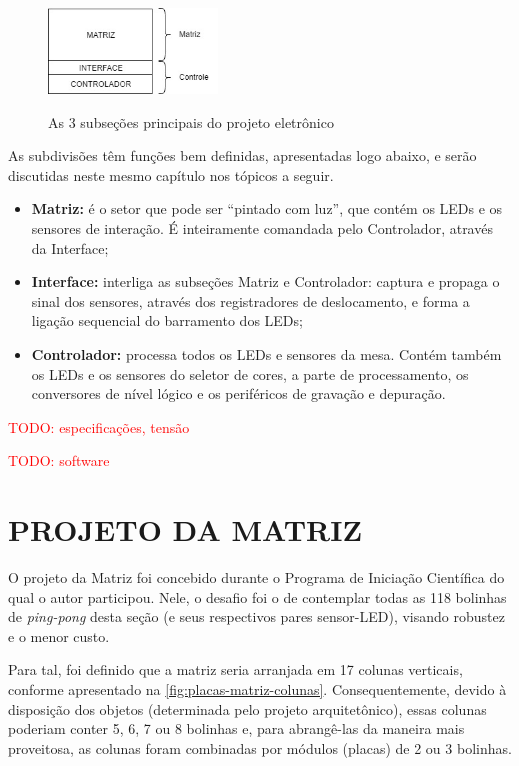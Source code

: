 \begin{figure}[H]
    \centering
    \caption{As 3 subseções principais do projeto eletrônico}
    \includegraphics[width=0.40\textwidth]{./dados/figuras/secoes}
    \label{fig:subsecoes}
\end{figure}

As subdivisões têm funções bem definidas, apresentadas logo abaixo, e serão discutidas neste mesmo capítulo nos tópicos a seguir.

\begin{itemize}
    \item \textbf{Matriz:} é o setor que pode ser ``pintado com luz'', que contém os LEDs e os sensores de interação. É inteiramente comandada pelo Controlador, através da Interface;
    \item \textbf{Interface:} interliga as subseções Matriz e Controlador: captura e propaga o sinal dos sensores, através dos registradores de deslocamento, e forma a ligação sequencial do barramento dos LEDs;
    \item \textbf{Controlador:} processa todos os LEDs e sensores da mesa. Contém também os LEDs e os sensores do seletor de cores, a parte de processamento, os conversores de nível lógico e os periféricos de gravação e depuração.
\end{itemize}

\textcolor{red}{TODO: especificações, tensão}

\textcolor{red}{TODO: software}

\section{PROJETO DA MATRIZ}
\label{sec:matriz}

O projeto da Matriz foi concebido durante o Programa de Iniciação Científica do qual o autor participou. Nele, o desafio foi o de contemplar todas as 118 bolinhas de \emph{ping-pong} desta seção (e seus respectivos pares sensor-LED), visando robustez e o menor custo.

Para tal, foi definido que a matriz seria arranjada em 17 colunas verticais, conforme apresentado na \autoref{fig:placas-matriz-colunas}. Consequentemente, devido à disposição dos objetos (determinada pelo projeto arquitetônico), essas colunas poderiam conter 5, 6, 7 ou 8 bolinhas e, para abrangê-las da maneira mais proveitosa, as colunas foram combinadas por módulos (placas) de 2 ou 3 bolinhas.

